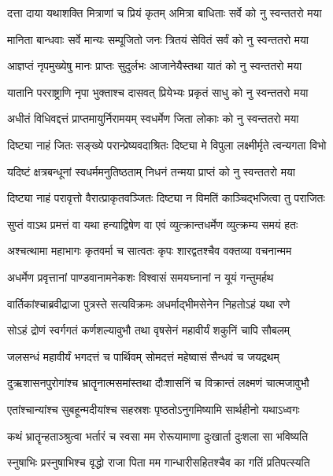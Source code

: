 \twolineshloka
{दत्ता दाया यथाशक्ति मित्राणां च प्रियं कृतम्}
{अमित्रा बाधिताः सर्वे को नु स्वन्ततरो मया}


\twolineshloka
{मानिता बान्धवाः सर्वे मान्यः सम्पूजितो जनः}
{त्रितयं सेवितं सर्वं को नु स्वन्ततरो मया}


\twolineshloka
{आज्ञप्तं नृपमुख्येषु मानः प्राप्तः सुदुर्लभः}
{आजानेयैस्तथा यातं को नु स्वन्ततरो मया}


\twolineshloka
{यातानि परराष्ट्राणि नृपा भुक्ताश्च दासवत्}
{प्रियेभ्यः प्रकृतं साधु को नु स्वन्ततरो मया}


\twolineshloka
{अधीतं विधिवद्दत्तं प्राप्तमायुर्निरामयम्}
{स्वधर्मेण जिता लोकाः को नु स्वन्ततरो मया}


\twolineshloka
{दिष्ट्या नाहं जितः सङ्ख्ये परान्प्रेष्यवदाश्रितः}
{दिष्ट्या मे विपुला लक्ष्मीर्मृते त्वन्यगता विभो}


\twolineshloka
{यदिष्टं क्षत्रबन्धूनां स्वधर्ममनुतिष्ठताम्}
{निधनं तन्मया प्राप्तं को नु स्वन्ततरो मया}


\twolineshloka
{दिष्ट्या नाहं परावृत्तो वैरात्प्राकृतवञ्जितः}
{दिष्ट्या न विमतिं काञ्चिद्भजित्वा तु पराजितः}


\twolineshloka
{सुप्तं वाऽथ प्रमत्तं वा यथा हन्याद्विषेण वा}
{एवं व्युत्क्रान्तधर्मेण व्युत्क्रम्य समयं हतः}


\twolineshloka
{अश्चत्थामा महाभागः कृतवर्मा च सात्वतः}
{कृपः शारद्वतश्चैव वक्तव्या वचनान्मम}


\twolineshloka
{अधर्मेण प्रवृत्तानां पाण्डवानामनेकशः}
{विश्वासं समयघ्नानां न यूयं गन्तुमर्हथ}


\twolineshloka
{वार्तिकांश्चाब्रवीद्राजा पुत्रस्ते सत्यविक्रमः}
{अधर्माद्भीमसेनेन निहतोऽहं यथा रणे}


\twolineshloka
{सोऽहं द्रोणं स्वर्गगतं कर्णशल्यावुभौ तथा}
{वृषसेनं महावीर्यं शकुनिं चापि सौबलम्}


\twolineshloka
{जलसन्धं महावीर्यं भगदत्तं च पार्थिवम्}
{सोमदत्तं महेष्वासं सैन्धवं च जयद्रथम्}


\twolineshloka
{दुऋशासनपुरोगांश्च भ्रातॄनात्मसमांस्तथा}
{दौःशासनिं च विक्रान्तं लक्ष्मणं चात्मजावुभौ}


\twolineshloka
{एतांश्चान्यांश्च सुबहून्मदीयांश्च सहस्रशः}
{पृष्ठतोऽनुगमिष्यामि सार्थहीनो यथाऽध्वगः}


\twolineshloka
{कथं भ्रातॄन्हताञ्श्रुत्वा भर्तारं च स्वसा मम}
{रोरूयामाणा दुःखार्ता दुःशला सा भविष्यति}


\twolineshloka
{स्नुषाभिः प्रस्नुषाभिश्च वृद्धो राजा पिता मम}
{गान्धारीसहितश्चैव का गतिं प्रतिपत्स्यति}


